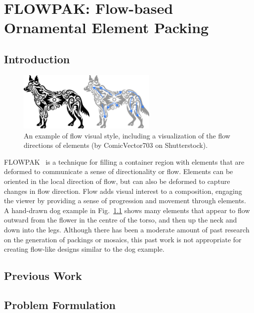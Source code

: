 
\chapter{FLOWPAK: Flow-based Ornamental Element Packing}




\section{Introduction}

\begin{figure}[ht] %
\centering
\includegraphics[width=0.6\textwidth]{figures/flowpak/dog_ornament_flow.pdf}
\vspace*{-8pt}
\caption{
  \label{dog_flow}
  An example of flow visual style, 
  including a visualization of the flow directions
of elements (by ComicVector703 on Shutterstock).
}
\end{figure}

FLOWPAK~\cite{Saputra2017} is a technique for filling a container 
region with elements that are deformed 
to communicate a sense of directionality or flow.
Elements can be oriented in the local direction 
of flow, but can also be deformed to capture changes in flow direction.
Flow adds visual interest to a composition,
engaging the viewer by providing a sense of progression and
movement through elements.
A hand-drawn dog example in Fig.~\ref{dog_flow} shows many elements that appear to flow
outward from the flower in the centre of the torso, and then
up the neck and down into the legs.
Although there has been a moderate amount of past research on
the generation of packings or mosaics,
this past work is not appropriate for creating flow-like
designs similar to the dog example.

\section{Previous Work}
\section{Problem Formulation}
